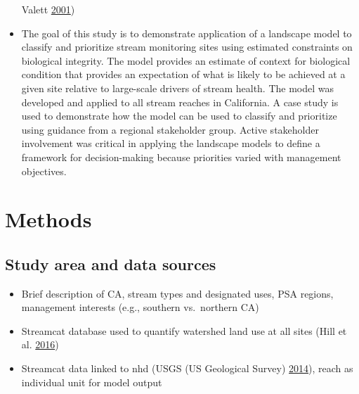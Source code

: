 \documentclass[]{article}
\begin{document}
\begin{itemize}
  Valett \protect\hyperlink{ref-Sponseller01}{2001})
\item
  The goal of this study is to demonstrate application of a landscape
  model to classify and prioritize stream monitoring sites using
  estimated constraints on biological integrity. The model provides an
  estimate of context for biological condition that provides an
  expectation of what is likely to be achieved at a given site relative
  to large-scale drivers of stream health. The model was developed and
  applied to all stream reaches in California. A case study is used to
  demonstrate how the model can be used to classify and prioritize using
  guidance from a regional stakeholder group. Active stakeholder
  involvement was critical in applying the landscape models to define a
  framework for decision-making because priorities varied with
  management objectives.
\end{itemize}

\section{Methods}\label{methods}

\subsection{Study area and data
sources}\label{study-area-and-data-sources}

\begin{itemize}
\item
  Brief description of CA, stream types and designated uses, PSA
  regions, management interests (e.g., southern vs.~northern CA)
\item
  Streamcat database used to quantify watershed land use at all sites
  (Hill et al. \protect\hyperlink{ref-Hill16}{2016})
\item
  Streamcat data linked to \ac{nhd} (USGS (US Geological Survey)
  \protect\hyperlink{ref-USGS14}{2014}), reach as individual unit for
  model output
\end{itemize}
\end{document}
